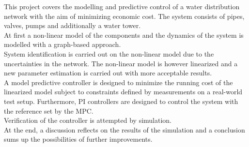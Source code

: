 


This project covers the modelling and predictive control of a water distribution network with the aim of minimizing economic cost. The system consists of pipes, valves, pumps and additionally a water tower.\\
At first a non-linear model of the components and the dynamics of the system is modelled with a graph-based approach.\\ 
System identification is carried out on the non-linear model due to the uncertainties in the network. The non-linear model is however linearized and a new parameter estimation is carried out with more acceptable results. \\
A model predictive controller is designed to minimize the running cost of the linearized model subject to constraints defined by measurements on a real-world test setup. Furthermore, PI controllers are designed to control the system with the reference set by the MPC. \\
Verification of the controller is attempted by simulation.\\
At the end, a discussion reflects on the results of the simulation and a conclusion sums up the possibilities of further improvements. 





